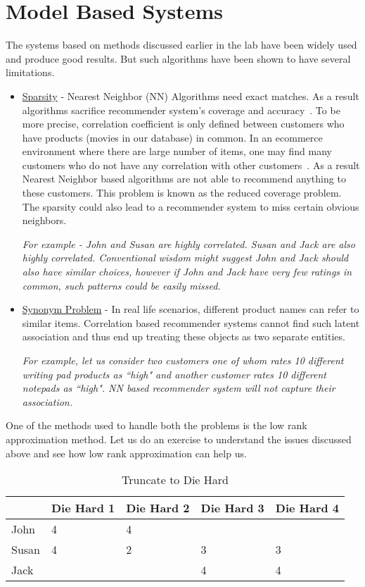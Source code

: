 \section{Model Based Systems}
  The systems based on methods discussed earlier in the lab have been widely used and produce good results. But such algorithms have been shown to have several limitations. 
  \begin{itemize}
    \item \underline{Sparsity} - Nearest Neighbor (NN) Algorithms need exact matches. As a result algorithms sacrifice recommender system's coverage and accuracy~\cite{model_ref1}. To be more precise, correlation coefficient is only defined between customers who have products (movies in our database) in common. In an ecommerce environment where there are large number of items, one may find many customers who do not have any correlation with other customers~\cite{model_ref2}. As a result Nearest Neighbor based algorithms are not able to recommend anything to these customers. This problem is known as the reduced coverage problem. The sparsity could also lead to a recommender system to miss certain obvious neighbors. 

\textit{For example - John and Susan are highly correlated. Susan and Jack are also highly correlated. Conventional wisdom might suggest John and Jack should also have similar choices, however if John and Jack have very few ratings in common, such patterns could be easily missed.}
    \item \underline{Synonym Problem} - In real life scenarios, different product names can refer to similar items. Correlation based recommender systems cannot find such latent association and thus end up treating these objects as two separate entities. 

\textit{For example, let us consider two customers one of whom rates 10 different writing pad products as ``high" and another customer rates 10 different notepads as ``high". NN based recommender system will not capture their association.}
  \end{itemize}
  One of the methods used to handle both the problems is the low rank approximation method. Let us do an exercise to understand the issues discussed above and see how low rank approximation can help us. \\
  \begin{table}[]
  \centering
  \label{my-label}
  \begin{tabular}{|l|l|l|l|l|}
  \hline
      & Die Hard 1 & Die Hard 2 & Die Hard 3 & Die Hard 4 \\ \hline
John  & 4          & 4          &            &            \\ \hline
Susan & 4          & 2          & 3          & 3          \\ \hline
Jack  &            &            & 4          & 4          \\ \hline
  \end{tabular}
  \caption{Truncate to Die Hard}
  \label{Model-1}
  \end{table}

